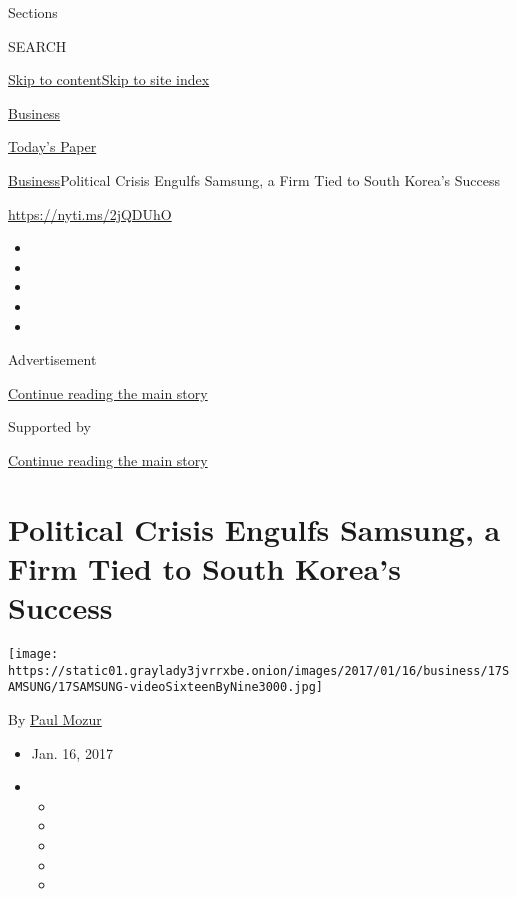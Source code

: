 Sections

SEARCH

\protect\hyperlink{site-content}{Skip to
content}\protect\hyperlink{site-index}{Skip to site index}

\href{https://www.nytimes3xbfgragh.onion/section/business}{Business}

\href{https://myaccount.nytimes3xbfgragh.onion/auth/login?response_type=cookie\&client_id=vi}{}

\href{https://www.nytimes3xbfgragh.onion/section/todayspaper}{Today's
Paper}

\href{/section/business}{Business}\textbar{}Political Crisis Engulfs
Samsung, a Firm Tied to South Korea's Success

\url{https://nyti.ms/2jQDUhO}

\begin{itemize}
\item
\item
\item
\item
\item
\end{itemize}

Advertisement

\protect\hyperlink{after-top}{Continue reading the main story}

Supported by

\protect\hyperlink{after-sponsor}{Continue reading the main story}

\hypertarget{political-crisis-engulfs-samsung-a-firm-tied-to-south-koreas-success}{%
\section{Political Crisis Engulfs Samsung, a Firm Tied to South Korea's
Success}\label{political-crisis-engulfs-samsung-a-firm-tied-to-south-koreas-success}}

\texttt{[image: https://static01.graylady3jvrrxbe.onion/images/2017/01/16/business/17SAMSUNG/17SAMSUNG-videoSixteenByNine3000.jpg]}

By \href{https://www.nytimes3xbfgragh.onion/by/paul-mozur}{Paul Mozur}

\begin{itemize}
\item
  Jan. 16, 2017
\item
  \begin{itemize}
  \item
  \item
  \item
  \item
  \item
  \end{itemize}
\end{itemize}

